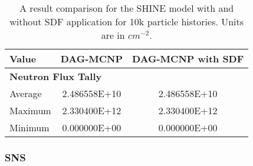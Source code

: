   \begin{table}[H]
    \small
    \begin{center}
      \begin{tabular}{lcc}
        \toprule
        Value   & DAG-MCNP     & DAG-MCNP with SDF      \\
        \toprule
        \multicolumn{3}{l}{\textbf{Neutron Flux Tally}} \\
        Average & 2.486558E+10 & 2.486558E+10           \\
        Maximum & 2.330400E+12 & 2.330400E+12           \\
        Minimum & 0.000000E+00 & 0.000000E+00           \\
        \bottomrule
      \end{tabular}
    \end{center}
    \caption[Flux tally results in the SHINE model for various DAG-MCNP
      implementations.]{A result comparison for the SHINE model with and without
      SDF application for 10k particle histories. Units are in $cm^{-2}$.}
  \end{table}
  
  \subsubsection{SNS}
  
